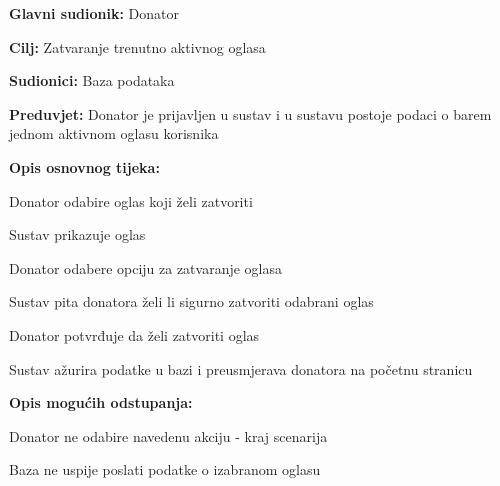 					\noindent {}
					\begin{packed_item}
	
						\item \textbf{Glavni sudionik: }Donator
						\item  \textbf{Cilj:} Zatvaranje trenutno aktivnog oglasa
						\item  \textbf{Sudionici:} Baza podataka
						\item  \textbf{Preduvjet:} Donator je prijavljen u sustav i u sustavu postoje podaci o barem jednom aktivnom oglasu korisnika
						
						\eject

						\item  \textbf{Opis osnovnog tijeka:}
						
						\item[] \begin{packed_enum}
							\item Donator odabire oglas koji želi zatvoriti
							\item Sustav prikazuje oglas
							\item Donator odabere opciju za zatvaranje oglasa
							\item Sustav pita donatora želi li sigurno zatvoriti odabrani oglas
							\item Donator potvrđuje da želi zatvoriti oglas
							\item Sustav ažurira podatke u bazi i preusmjerava donatora na početnu stranicu
						\end{packed_enum}

						\item  \textbf{Opis mogućih odstupanja:}

						\item[] \begin{packed_item}
							\item[1.a] Donator ne odabire navedenu akciju - kraj scenarija
							\item[2.a] Baza ne uspije poslati podatke o izabranom oglasu
							\item[] \begin{packed_enum}
								

\end{packed_enum}
\end{packed_item}
\end{packed_item}
